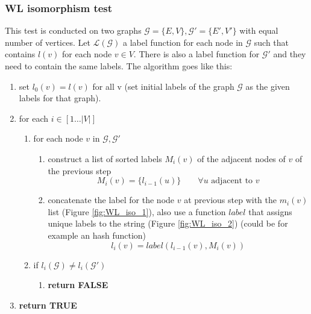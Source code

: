         \subsubsection{WL isomorphism test}
            This test is conducted on two graphs $\mathcal{G} = \{E, V\}, \mathcal{G'} = \{E', V'\}$ with equal number of vertices. 
            Let $\mathcal{L}(\mathcal{G})$ a label function for each node in $\mathcal{G}$ such that contains $l(v)$ for each node $ v \in V $. There is also a label function for $\mathcal{G}'$ and they need to contain the same labels. 
            The algorithm goes like this:
            \begin{enumerate}
                \item set $l_0 (v) = l(v)$ for all v (set initial labels of the graph $\mathcal{G}$ as the given labels for that graph).
                \item for each $i \in [ 1 \dots |V| ]$
                \begin{enumerate}
                    \item for each node $v$ in $\mathcal{G}, \mathcal{G'}$
                    \begin{enumerate}
                        \item construct a list of sorted labels $M_i (v)$ of the adjacent nodes of $v$ of the previous step
                        $$M_i (v) = \{ l_{i-1} (u) \} \qquad \forall u \text{ adjacent to } v$$
                        \item concatenate the label for the node $v$ at previous step with the $m_i (v)$ list (Figure \ref{fig:WL_iso_1}), also use a function $label$ that assigns unique labels to the string (Figure \ref{fig:WL_iso_2}) (could be for example an hash function)
                        $$l_i (v) = label (l_{i-1} (v), M_i(v))$$
                    \end{enumerate}
                    \item if $l_i(\mathcal{G}) \neq l_i(\mathcal{G'})$
                    \begin{enumerate}
                        \item \textbf{return FALSE}   
                    \end{enumerate}
                \end{enumerate}
                \item \textbf{return TRUE}
            \end{enumerate}

